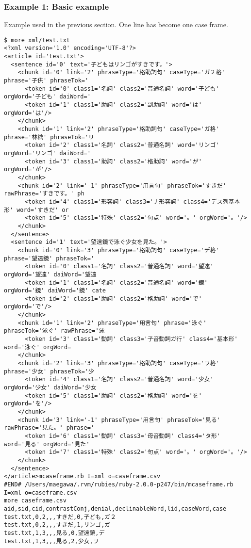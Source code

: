 \subsubsection*{Example 1: Basic example}

Example used in the previous section. One line has become one case frame. 


\begin{Verbatim}[baselinestretch=0.7,frame=single]
$ more xml/test.txt
<?xml version='1.0' encoding='UTF-8'?>
<article id='test.txt'>
  <sentence id='0' text='子どもはリンゴがすきです。'>
    <chunk id='0' link='2' phraseType='格助詞句' caseType='ガ２格' phrase='子供' phraseTok='
      <token id='0' class1='名詞' class2='普通名詞' word='子ども' orgWord='子ども' daiWord='
      <token id='1' class1='助詞' class2='副助詞' word='は' orgWord='は'/>
    </chunk>
    <chunk id='1' link='2' phraseType='格助詞句' caseType='ガ格' phrase='林檎' phraseTok='リ
      <token id='2' class1='名詞' class2='普通名詞' word='リンゴ' orgWord='リンゴ' daiWord='
      <token id='3' class1='助詞' class2='格助詞' word='が' orgWord='が'/>
    </chunk>
    <chunk id='2' link='-1' phraseType='用言句' phraseTok='すきだ' rawPhrase='すきです。' ph
      <token id='4' class1='形容詞' class3='ナ形容詞' class4='デス列基本形' word='すきだ' or
      <token id='5' class1='特殊' class2='句点' word='。' orgWord='。'/>
    </chunk>
  </sentence>
  <sentence id='1' text='望遠鏡で泳ぐ少女を見た。'>
    <chunk id='0' link='3' phraseType='格助詞句' caseType='デ格' phrase='望遠鏡' phraseTok='
      <token id='0' class1='名詞' class2='普通名詞' word='望遠' orgWord='望遠' daiWord='望遠
      <token id='1' class1='名詞' class2='普通名詞' word='鏡' orgWord='鏡' daiWord='鏡' cate
      <token id='2' class1='助詞' class2='格助詞' word='で' orgWord='で'/>
    </chunk>
    <chunk id='1' link='2' phraseType='用言句' phrase='泳ぐ' phraseTok='泳ぐ' rawPhrase='泳
      <token id='3' class1='動詞' class3='子音動詞ガ行' class4='基本形' word='泳ぐ' orgWord=
    </chunk>
    <chunk id='2' link='3' phraseType='格助詞句' caseType='ヲ格' phrase='少女' phraseTok='少
      <token id='4' class1='名詞' class2='普通名詞' word='少女' orgWord='少女' daiWord='少女
      <token id='5' class1='助詞' class2='格助詞' word='を' orgWord='を'/>
    </chunk>
    <chunk id='3' link='-1' phraseType='用言句' phraseTok='見る' rawPhrase='見た。' phrase='
      <token id='6' class1='動詞' class3='母音動詞' class4='タ形' word='見る' orgWord='見た'
      <token id='7' class1='特殊' class2='句点' word='。' orgWord='。'/>
    </chunk>
  </sentence>
</article>mcaseframe.rb I=xml o=caseframe.csv
#END# /Users/maegawa/.rvm/rubies/ruby-2.0.0-p247/bin/mcaseframe.rb I=xml o=caseframe.csv
more caseframe.csv
aid,sid,cid,contrastConj,denial,declinableWord,lid,caseWord,case
test.txt,0,2,,,すきだ,0,子ども,ガ２
test.txt,0,2,,,すきだ,1,リンゴ,ガ
test.txt,1,3,,,見る,0,望遠鏡,デ
test.txt,1,3,,,見る,2,少女,ヲ
\end{Verbatim}
